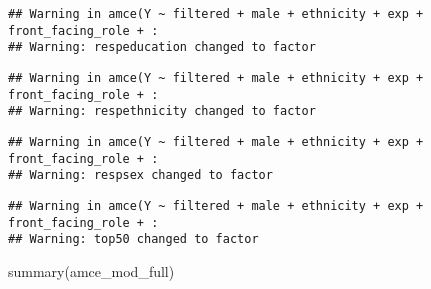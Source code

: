 \documentclass[
]{article}
\newenvironment{Shaded}{\begin{snugshade}}{\end{snugshade}}
\newcommand{\FunctionTok}[1]{\textcolor[rgb]{0.00,0.00,0.00}{#1}}
\newcommand{\NormalTok}[1]{#1}
\begin{document}
\begin{verbatim}
## Warning in amce(Y ~ filtered + male + ethnicity + exp + front_facing_role + :
## Warning: respeducation changed to factor
\end{verbatim}

\begin{verbatim}
## Warning in amce(Y ~ filtered + male + ethnicity + exp + front_facing_role + :
## Warning: respethnicity changed to factor
\end{verbatim}

\begin{verbatim}
## Warning in amce(Y ~ filtered + male + ethnicity + exp + front_facing_role + :
## Warning: respsex changed to factor
\end{verbatim}

\begin{verbatim}
## Warning in amce(Y ~ filtered + male + ethnicity + exp + front_facing_role + :
## Warning: top50 changed to factor
\end{verbatim}

\begin{Shaded}
\begin{Highlighting}[]
\FunctionTok{summary}\NormalTok{(amce\_mod\_full)}
\end{Highlighting}
\end{Shaded}
\end{document}
